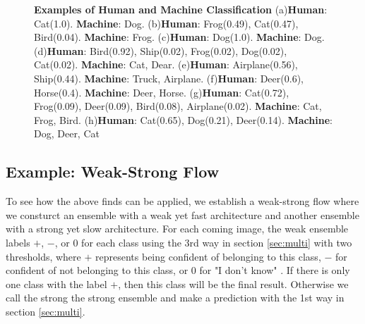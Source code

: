 \documentclass{article}
\begin{document}
\begin{figure}[H]
    \caption{\textbf{Examples of Human and Machine Classification} (a)\textbf{Human}: Cat(1.0). \textbf{Machine}: Dog. (b)\textbf{Human}: Frog(0.49), Cat(0.47), Bird(0.04). \textbf{Machine}: Frog. (c)\textbf{Human}: Dog(1.0). \textbf{Machine}: Dog. (d)\textbf{Human}: Bird(0.92), Ship(0.02), Frog(0.02), Dog(0.02), Cat(0.02). \textbf{Machine}: Cat, Dear. (e)\textbf{Human}: Airplane(0.56), Ship(0.44). \textbf{Machine}: Truck, Airplane. (f)\textbf{Human}: Deer(0.6), Horse(0.4). \textbf{Machine}: Deer, Horse. (g)\textbf{Human}: Cat(0.72), Frog(0.09), Deer(0.09), Bird(0.08), Airplane(0.02). \textbf{Machine}: Cat, Frog, Bird. (h)\textbf{Human}: Cat(0.65), Dog(0.21), Deer(0.14). \textbf{Machine}: Dog, Deer, Cat} 
    \label{fig:human_machine_example}
\end{figure}



\subsection{Example: Weak-Strong Flow}
To see how the above finds can be applied, we establish a weak-strong flow where we consturct an ensemble with a weak yet fast architecture and another ensemble with a strong yet slow architecture. For each coming image, the weak ensemble labels $+$, $-$, or $0$ for each class using the 3rd way in section \ref{sec:multi} with two thresholds, where $+$ represents being confident of belonging to this class, $-$ for confident of not belonging to this class, or $0$ for "I don't know" . If there is only one class with the label $+$, then this class will be the final result. Otherwise we call the strong the strong ensemble and make a prediction with the 1st way in section \ref{sec:multi}. 
\end{document}
